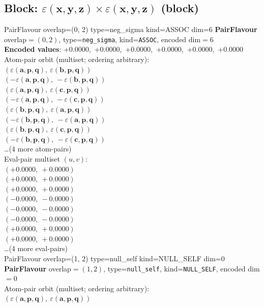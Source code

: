 \documentclass[a4paper,11pt]{article}
\newcommand{\kblbmcpggoncpf}[3]{\varepsilon(\mathbf{#1},\mathbf{#2},\mathbf{#3})}
\begin{document}
\subsection{Block: $\kblbmcpggoncpf{x}{y}{z} \times \kblbmcpggoncpf{x}{y}{z}$  (block)}
    PairFlavour  overlap=(0, 2)  type=neg\_sigma  kind=ASSOC  dim=6
\textbf{PairFlavour} overlap$=(0, 2)$, type=\texttt{neg\_sigma}, kind=\texttt{ASSOC}, encoded dim$=6$\\
\textbf{      Encoded values}: +0.0000,\ +0.0000,\ +0.0000,\ +0.0000,\ +0.0000,\ +0.0000\\
\quad Atom-pair orbit (multiset; ordering arbitrary):\\
$(\kblbmcpggoncpf{a}{p}{q},\ \kblbmcpggoncpf{b}{p}{q})$\\
$(-\kblbmcpggoncpf{a}{p}{q},\ -\kblbmcpggoncpf{b}{p}{q})$\\
$(\kblbmcpggoncpf{a}{p}{q},\ \kblbmcpggoncpf{c}{p}{q})$\\
$(-\kblbmcpggoncpf{a}{p}{q},\ -\kblbmcpggoncpf{c}{p}{q})$\\
$(\kblbmcpggoncpf{b}{p}{q},\ \kblbmcpggoncpf{a}{p}{q})$\\
$(-\kblbmcpggoncpf{b}{p}{q},\ -\kblbmcpggoncpf{a}{p}{q})$\\
$(\kblbmcpggoncpf{b}{p}{q},\ \kblbmcpggoncpf{c}{p}{q})$\\
$(-\kblbmcpggoncpf{b}{p}{q},\ -\kblbmcpggoncpf{c}{p}{q})$\\
\quad \ldots (4 more atom-pairs)\\
\quad Eval-pair multiset $(u, v)$:\\
$(+0.0000,\ +0.0000)$\\
$(+0.0000,\ +0.0000)$\\
$(+0.0000,\ +0.0000)$\\
$(-0.0000,\ -0.0000)$\\
$(-0.0000,\ -0.0000)$\\
$(-0.0000,\ -0.0000)$\\
$(+0.0000,\ +0.0000)$\\
$(+0.0000,\ +0.0000)$\\
\quad \ldots (4 more eval-pairs)\\
    PairFlavour  overlap=(1, 2)  type=null\_self  kind=NULL\_SELF  dim=0
\textbf{PairFlavour} overlap$=(1, 2)$, type=\texttt{null\_self}, kind=\texttt{NULL\_SELF}, encoded dim$=0$\\
\quad Atom-pair orbit (multiset; ordering arbitrary):\\
$(\kblbmcpggoncpf{a}{p}{q},\ \kblbmcpggoncpf{a}{p}{q})$\\
\end{document}

